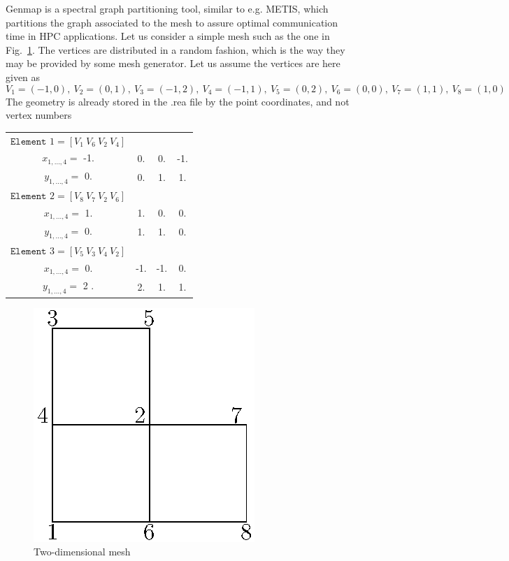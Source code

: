Genmap is a spectral graph partitioning tool, similar to e.g. METIS, which partitions the graph associated to the mesh to assure optimal communication time in HPC applications. Let us consider a simple mesh such as the one in Fig.~\ref{fig:genmap}. The vertices are distributed in a random fashion, which is the way they may be provided by some mesh generator. Let us assume the vertices are here given as
\[V_1=(-1,0),\ V_2=(0,1),\ V_3=(-1,2),\ V_4=(-1,1),\ V_5=(0,2),\ V_6=(0,0),\ V_7=(1,1),\ V_8=(1,0)\]
The geometry is already stored in the .rea file by the point coordinates, and not vertex numbers
\begin{tabular}{c c c c}
  \(\texttt{Element } 1=[V_1\ V_6\ V_2\ V_4]\)&&&\\
  \(x_{1,\ldots,4}=\) -1. & 0. & 0. & -1.\\
  \(y_{1,\ldots,4}=\) 0.  & 0. & 1. &1.\\
  \(\texttt{Element } 2=[V_8\ V_7\ V_2\ V_6]\)&&&\\
  \(x_{1,\ldots,4}=\) 1. & 1. & 0. & 0.\\
  \(y_{1,\ldots,4}=\) 0. & 1. & 1. &0.\\
  \(\texttt{Element } 3=[V_5\ V_3\ V_4\ V_2]\)&&&\\
  \(x_{1,\ldots,4}=\) 0. & -1. & -1. & 0.\\
  \(y_{1,\ldots,4}=\) 2 .& 2.  & 1.  &1.\\
  \end{tabular}

\begin{figure}
\centering
\includegraphics[scale=1]{Figs/genmap_sketch}
\caption{Two-dimensional mesh}
\label{fig:genmap}
\end{figure}


